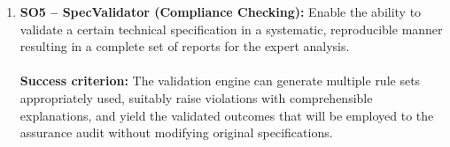 \begin{enumerate}
  \item \textbf{\textcolor[HTML]{003D99}{SO5 -- SpecValidator (Compliance Checking):}} Enable the ability to validate a certain technical specification in a systematic, reproducible manner resulting in a complete set of reports for the expert analysis.
  \\\\
  \textbf{Success criterion:} The validation engine can generate multiple rule sets appropriately used, suitably raise violations with comprehensible explanations, and yield the validated outcomes that will be employed to the assurance audit without modifying original specifications.
  
\end{enumerate}

